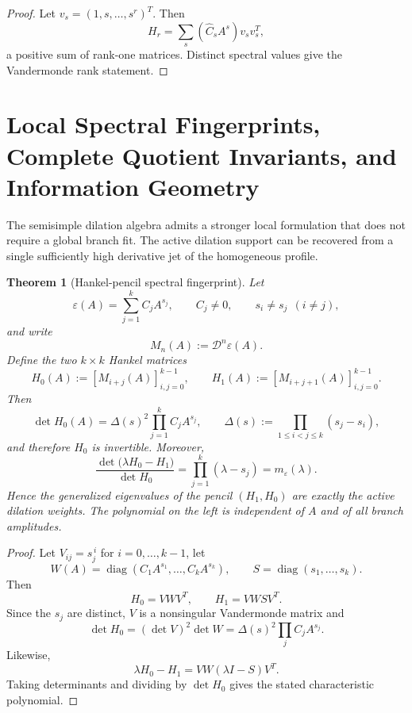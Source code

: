 \documentclass[aps,prd,reprint,onecolumn,nofootinbib,superscriptaddress,showkeys]{revtex4-2}
\numberwithin{equation}{section}
\theoremstyle{definition}
\theoremstyle{plain}
\newtheorem{theorem}{Theorem}[section]
\newcommand{\Dil}{\mathscr D}
\newcommand{\diag}{\operatorname{diag}}
\begin{document}
\begin{proof}
Let \(v_s=(1,s,\ldots,s^r)^T\).  Then
\[
H_r=\sum_s(\widehat C_sA^s)v_sv_s^T,
\]
a positive sum of rank-one matrices.  Distinct spectral values give the Vandermonde rank statement.
\end{proof}


\section{Local Spectral Fingerprints, Complete Quotient Invariants, and Information Geometry}

The semisimple dilation algebra admits a stronger local formulation that does not require a global branch fit.  The active dilation support can be recovered from a single sufficiently high derivative jet of the homogeneous profile.

\begin{theorem}[Hankel-pencil spectral fingerprint]\label{thm:hankel-pencil}
Let
\begin{equation}
\varepsilon(A)=\sum_{j=1}^{k} C_j A^{s_j},
\qquad
C_j\neq0,
\qquad
s_i\neq s_j\ \ (i\neq j),
\end{equation}
and write
\begin{equation}
M_n(A):=\Dil^n\varepsilon(A).
\end{equation}
Define the two $k\times k$ Hankel matrices
\begin{equation}
H_0(A):=[M_{i+j}(A)]_{i,j=0}^{k-1},
\qquad
H_1(A):=[M_{i+j+1}(A)]_{i,j=0}^{k-1}.
\end{equation}
Then
\begin{equation}
\det H_0(A)
=
\Delta(s)^2\prod_{j=1}^{k} C_j A^{s_j},
\qquad
\Delta(s):=\prod_{1\le i<j\le k}(s_j-s_i),
\end{equation}
and therefore $H_0$ is invertible.  Moreover,
\begin{equation}
\boxed{
\frac{\det\!\bigl(\lambda H_0-H_1\bigr)}{\det H_0}
=
\prod_{j=1}^{k}(\lambda-s_j)
=
 m_\varepsilon(\lambda).
}
\end{equation}
Hence the generalized eigenvalues of the pencil $(H_1,H_0)$ are exactly the active dilation weights.  The polynomial on the left is independent of $A$ and of all branch amplitudes.
\end{theorem}

\begin{proof}
Let $V_{ij}=s_j^{\,i}$ for $i=0,\ldots,k-1$, let
\[
W(A)=\diag(C_1A^{s_1},\ldots,C_kA^{s_k}),
\qquad
S=\diag(s_1,\ldots,s_k).
\]
Then
\begin{equation}
H_0=VWV^T,
\qquad
H_1=VWSV^T.
\end{equation}
Since the $s_j$ are distinct, $V$ is a nonsingular Vandermonde matrix and
\[
\det H_0=(\det V)^2\det W
=\Delta(s)^2\prod_j C_jA^{s_j}.
\]
Likewise,
\[
\lambda H_0-H_1
=VW(\lambda I-S)V^T.
\]
Taking determinants and dividing by $\det H_0$ gives the stated characteristic polynomial.
\end{proof}
\end{document}
